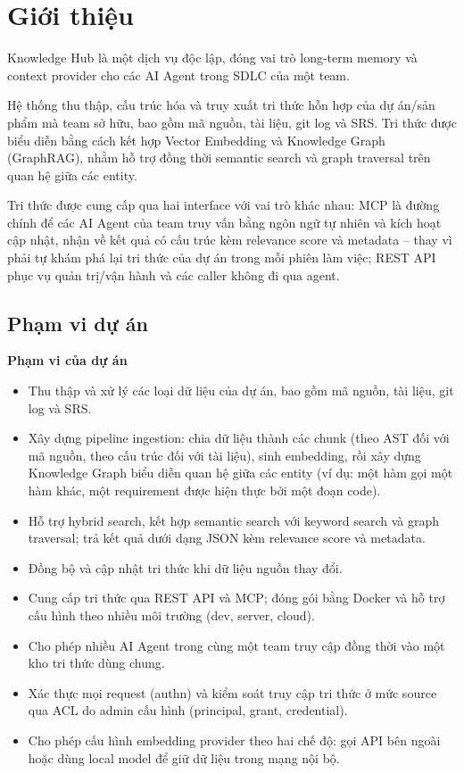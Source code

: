 \section{Giới thiệu}

Knowledge Hub là một dịch vụ độc lập, đóng vai trò long-term memory và context provider cho các AI Agent trong SDLC của một team. 

Hệ thống thu thập, cấu trúc hóa và truy xuất tri thức hỗn hợp của dự án/sản phẩm mà team sở hữu, bao gồm mã nguồn, tài liệu, git log và SRS. Tri thức được biểu diễn bằng cách kết hợp Vector Embedding và Knowledge Graph (GraphRAG), nhằm hỗ trợ đồng thời semantic search và graph traversal trên quan hệ giữa các entity. 

Tri thức được cung cấp qua hai interface với vai trò khác nhau: MCP là đường chính để các AI Agent của team truy vấn bằng ngôn ngữ tự nhiên và kích hoạt cập nhật, nhận về kết quả có cấu trúc kèm relevance score và metadata -- thay vì phải tự khám phá lại tri thức của dự án trong mỗi phiên làm việc; REST API phục vụ quản trị/vận hành và các caller không đi qua agent.

\subsection{Phạm vi dự án}

\textbf{Phạm vi của dự án}

\begin{itemize}
  \item Thu thập và xử lý các loại dữ liệu của dự án, bao gồm mã nguồn, tài liệu, git log và SRS.
  \item Xây dựng pipeline ingestion: chia dữ liệu thành các chunk (theo AST đối với mã nguồn, theo cấu trúc đối với tài liệu), sinh embedding, rồi xây dựng Knowledge Graph biểu diễn quan hệ giữa các entity (ví dụ: một hàm gọi một hàm khác, một requirement được hiện thực bởi một đoạn code).
  \item Hỗ trợ hybrid search, kết hợp semantic search với keyword search và graph traversal; trả kết quả dưới dạng JSON kèm relevance score và metadata.
  \item Đồng bộ và cập nhật tri thức khi dữ liệu nguồn thay đổi.
  \item Cung cấp tri thức qua REST API và MCP; đóng gói bằng Docker và hỗ trợ cấu hình theo nhiều môi trường (dev, server, cloud).
  \item Cho phép nhiều AI Agent trong cùng một team truy cập đồng thời vào một kho tri thức dùng chung.
  \item Xác thực mọi request (authn) và kiểm soát truy cập tri thức ở mức source qua ACL do admin cấu hình (principal, grant, credential).
  \item Cho phép cấu hình embedding provider theo hai chế độ: gọi API bên ngoài hoặc dùng local model để giữ dữ liệu trong mạng nội bộ.
\end{itemize}

